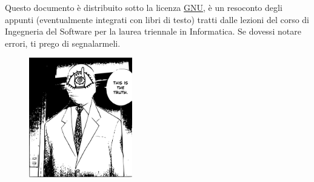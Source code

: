\documentclass[10pt, letterpaper]{report}
\begin{document}
\newpage
\pagecolor{cartaRiciclata}%
\Large
Questo documento è distribuito sotto la licenza 
\color{blue}\href{https://www.gnu.org/licenses/fdl-1.3.txt}{GNU}\color{black},  
è un resoconto degli appunti (eventualmente integrati con libri di testo) tratti dalle lezioni del corso di Ingegneria del Software
\hphantom{a}per la laurea 
triennale in Informatica. Se dovessi notare errori, ti prego di segnalarmeli.
\vfill
\begin{figure}[h!]
    \raggedright
    \includegraphics[width=0.4\textwidth,right ]{../../../preamble/tomodachi.pdf} 
\end{figure}
\newpage %
\normalsize
\tableofcontents 
\newpage

\fancyhf{}
\fancyhead[L]{\nouppercase{\leftmark}}
\fancyfoot[C]{\thepage}


\end{document}
